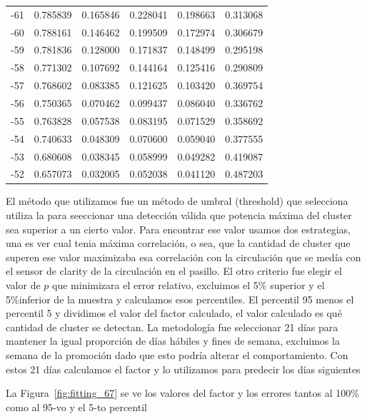 \begin{table}[]
\begin{tabular}{|l|l|ll|ll|}
-61 & 0.785839 & 0.165846      & 0.228041      & 0.198663 & 0.313068       \\
-60 & 0.788161 & 0.146462      & 0.199509      & 0.172974 & 0.306679       \\
-59 & 0.781836 & 0.128000      & 0.171837      & 0.148499 & 0.295198       \\
-58 & 0.771302 & 0.107692      & 0.144164      & 0.125416 & 0.290809       \\
-57 & 0.768602 & 0.083385      & 0.121625      & 0.103420 & 0.369754       \\
-56 & 0.750365 & 0.070462      & 0.099437      & 0.086040 & 0.336762       \\
-55 & 0.763828 & 0.057538      & 0.083195      & 0.071529 & 0.358692       \\
-54 & 0.740633 & 0.048309      & 0.070600      & 0.059040 & 0.377555       \\
-53 & 0.680608 & 0.038345      & 0.058999      & 0.049282 & 0.419087       \\
-52 & 0.657073 & 0.032005      & 0.052038      & 0.041120 & 0.487203       \\
\hline
\end{tabular}
\end{table}

El método que utilizamos fue un método de umbral (threshold) que selecciona utiliza la para seeccionar una detección válida que potencia máxima del cluster sea superior a un cierto valor. Para encontrar ese valor usamos dos estrategias, una es ver cual tenia máxima correlación, o sea, que la cantidad de cluster que superen ese valor maximizaba esa correlación con la circulación que se medía con el sensor de clarity de la circulación en el pasillo.
El otro criterio fue elegir el valor de $p$ que minimizara el error relativo, 
excluimos el 5\% superior y el 5\%inferior de la muestra y calculamos esos percentiles. 
El percentil 95 menos el percentil 5 y dividimos el valor del factor calculado, el valor calculado es qué cantidad de cluster se detectan.
La metodología fue seleccionar 21 días para mantener la igual proporción de días hábiles y fines de semana, excluimos la semana de la promoción dado que esto podría alterar el comportamiento. Con estos 21 días calculamos el factor y lo utilizamos  para predecir los días siguientes

La Figura~\ref{fig:fitting_67} se ve los valores del factor y los errores tantos al 100\% 
como al 95-vo y el 5-to percentil

